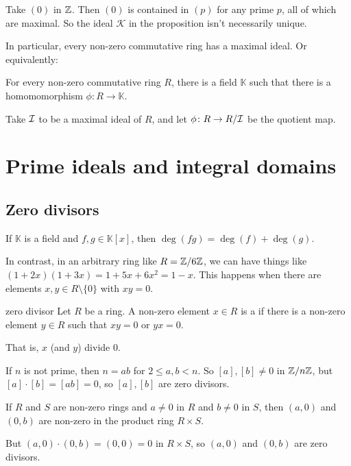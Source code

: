 \documentclass[12pt,letterpaper]{report}
\begin{document}
\begin{ex}
  Take $(0)$ in $\mathbb{Z}$.
  Then $(0)$ is contained in $(p)$ for any prime $p$, all of which are maximal.
  So the ideal $\mathcal{K}$ in the proposition isn't necessarily unique.
\end{ex}

In particular, every non-zero commutative ring has a maximal ideal.
Or equivalently:

\begin{cor}{}{}
  For every non-zero commutative ring $R$, there is a field $\mathbb{K}$ such that there is a
  homomomorphism $\phi \colon R \to \mathbb{K}$.
\end{cor}

\begin{thmproof}
  Take $\mathcal{I}$ to be a maximal ideal of $R$, and let $\phi \colon R \to R/\mathcal{I}$ be the quotient
  map.
\end{thmproof}

\section{Prime ideals and integral domains}

\subsection{Zero divisors}

If $\mathbb{K}$ is a field and $f, g \in \mathbb{K}[x]$, then $\deg(fg) = \deg(f) + \deg(g)$.

In contrast, in an arbitrary ring like $R = \mathbb{Z}/{6}\mathbb{Z}$, we can have things like
$(1 + 2x)(1 + 3x) = 1 + 5x + 6x^2 = 1 - x$.
This happens when there are elements $x, y \in R \setminus \{0\}$ with $xy = 0$.

\begin{defn}{zero divisor}{}
  Let $R$ be a ring.
  A non-zero element $x \in R$ is a  if there is a non-zero element $y \in R$
  such that $xy = 0$ or $yx = 0$.
\end{defn}

That is, $x$ (and $y$) divide 0.

\begin{ex}
  If $n$ is not prime, then $n = ab$ for $2 \leq a, b < n$.
  So $[a], [b] \neq 0$ in $\mathbb{Z}/{n}\mathbb{Z}$, but $[a] \cdot [b] = [ab] = 0$, so $[a], [b]$ are zero
  divisors.
\end{ex}

\begin{ex}
  If $R$ and $S$ are non-zero rings and $a \neq 0$ in $R$ and $b \neq 0$ in $S$, then
  $(a, 0)$ and $(0, b)$ are non-zero in the product ring $R \times S$.

  But $(a, 0) \cdot (0, b) = (0, 0) = 0$ in $R \times S$, so $(a, 0)$ and $(0, b)$ are zero
  divisors.
\end{ex}
\end{document}
